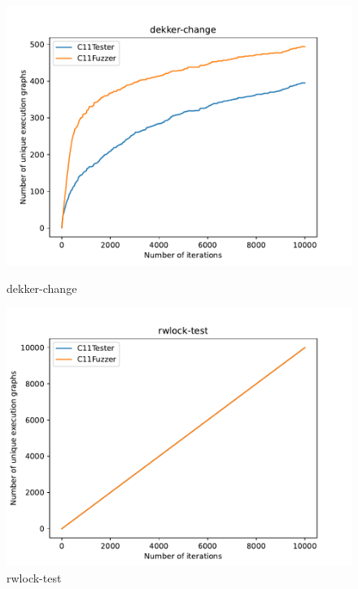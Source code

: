 \begin{figure}[H]
	\centering
	\begin{minipage}{0.45\textwidth}
		\centering
		\includegraphics[width=\textwidth]{figure/dekker-change.pdf}
		\caption{dekker-change}
		\label{cover-plot1-dekker-change}
	\end{minipage}
	\hfill
	\begin{minipage}{0.45\textwidth}
		\centering
		\includegraphics[width=\textwidth]{figure/rwlock-test.pdf}
		\caption{rwlock-test}
		\label{cover-plot1-rwlock-test}
	\end{minipage}

	\vspace{0.5cm}


\end{figure}
